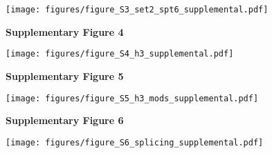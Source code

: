 \documentclass[9pt, letterpaper]{extarticle}
\begin{document}
{\centering \texttt{[image: figures/figure\_S3\_set2\_spt6\_supplemental.pdf]}\par}

\newpage

\textbf{\large Supplementary Figure 4}

{\centering \texttt{[image: figures/figure\_S4\_h3\_supplemental.pdf]}\par}

\newpage

\textbf{\large Supplementary Figure 5}

{\centering \texttt{[image: figures/figure\_S5\_h3\_mods\_supplemental.pdf]}\par}

\newpage

\textbf{\large Supplementary Figure 6}

{\centering \texttt{[image: figures/figure\_S6\_splicing\_supplemental.pdf]}\par}

\newpage
\end{document}
